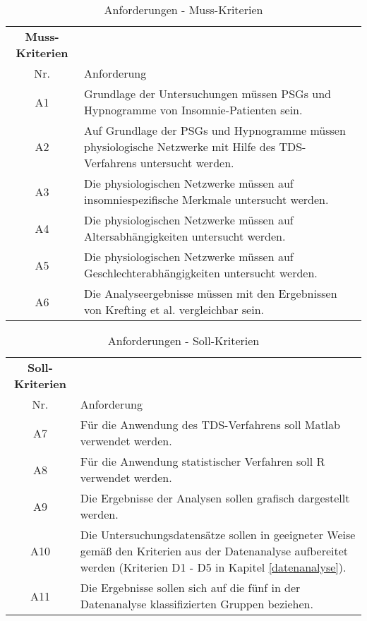 \begin{table}[H] 
\begin{tabularx}{\textwidth}{cllX}
\toprule
\multicolumn{3}{c}{\textbf{Muss-Kriterien}} & \\  
\cmidrule{1-3}
\multicolumn{3}{c}{Nr.} & Anforderung\\ 
\midrule 
\multicolumn{3}{c}{A1} &  Grundlage der Untersuchungen müssen \acs{PSG}s und Hypnogramme von Insomnie-Patienten sein.\\
\multicolumn{3}{c}{A2} & Auf Grundlage der \acs{PSG}s und Hypnogramme müssen physiologische Netzwerke mit Hilfe des \acs{TDS}-Verfahrens untersucht werden.\\
\multicolumn{3}{c}{A3} & Die physiologischen Netzwerke müssen auf insomniespezifische Merkmale untersucht werden.\\ 
\multicolumn{3}{c}{A4} & Die physiologischen Netzwerke müssen auf Altersabhängigkeiten untersucht werden.\\ 
\multicolumn{3}{c}{A5} & Die physiologischen Netzwerke müssen auf Geschlechterabhängigkeiten untersucht werden.\\
\multicolumn{3}{c}{A6} & Die Analyseergebnisse müssen mit den Ergebnissen von Krefting et al. \parencite{krefting_age_2017} vergleichbar sein.\\
\bottomrule
\end{tabularx}
\caption{Anforderungen - Muss-Kriterien}
\label{tab:Muss-Kriterien}
\end{table}


\begin{table}[H] 
\begin{tabularx}{\textwidth}{cllX}
\toprule
\multicolumn{3}{c}{\textbf{Soll-Kriterien}} & \\  
\cmidrule{1-3}
\multicolumn{3}{c}{Nr.} & Anforderung\\ 
\midrule 
\multicolumn{3}{c}{A7} &  Für die Anwendung des \acs{TDS}-Verfahrens soll Matlab verwendet werden.\\
\multicolumn{3}{c}{A8} & Für die Anwendung statistischer Verfahren soll R verwendet werden.\\
\multicolumn{3}{c}{A9} & Die Ergebnisse der Analysen sollen grafisch dargestellt werden.\\ 
\multicolumn{3}{c}{A10} & Die Untersuchungsdatensätze sollen in geeigneter Weise gemäß den Kriterien aus der Datenanalyse aufbereitet werden (Kriterien D1 - D5 in Kapitel \ref{datenanalyse}).\\
\multicolumn{3}{c}{A11} & Die Ergebnisse sollen sich auf die fünf in der Datenanalyse klassifizierten Gruppen beziehen.\\
\bottomrule
\end{tabularx}
\caption{Anforderungen - Soll-Kriterien}
\label{tab:Soll-Kriterien}
\end{table}


